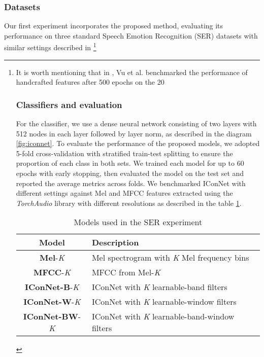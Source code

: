 \subsubsection{Datasets}
Our first experiment incorporates the proposed method, evaluating its performance on three standard Speech Emotion Recognition (SER) datasets with similar settings described in \cite{vu2022muser} \footnote{It is worth mentioning that in \cite{vu2022muser}, Vu et al. benchmarked the performance of handcrafted features after 500 epochs on the 20\
\subsubsection{Classifiers and evaluation}
For the classifier, we use a dense neural network consisting of two layers with 512 nodes in each layer followed by layer norm, as described in the diagram \ref{fig:iconnet}. To evaluate the performance of the proposed models, we adopted 5-fold cross-validation with stratified train-test splitting to ensure the proportion of each class in both sets. We trained each model for up to 60 epochs with early stopping, then evaluated the model on the test set and reported the average metrics across folds. We benchmarked IConNet with different settings against Mel and MFCC features extracted using the \textit{TorchAudio} library \cite{yang2021torchaudio} with different resolutions as described in the table \ref{table:ser_models}. 

\begin{table}[!ht]
    \centering
	\caption[SER models]{Models used in the SER experiment}
    \label{table:ser_models}
    \begin{tabular}{cl}
        \toprule
        \textbf{Model} & \textbf{Description} \\
        \midrule
        \textbf{Mel}-\textit{K} & Mel spectrogram with \textit{K} Mel frequency bins \\
        \textbf{MFCC}-\textit{K} & MFCC from Mel-\textit{K} \\
        \midrule
        \textbf{IConNet-B}-\textit{K} & IConNet with \textit{K} learnable-band filters\\
        \textbf{IConNet-W}-\textit{K} & IConNet with \textit{K} learnable-window filters\\
        \textbf{IConNet-BW}-\textit{K} & IConNet with \textit{K} learnable-band-window filters\\
        \bottomrule
    \end{tabular}
\end{table}

}
